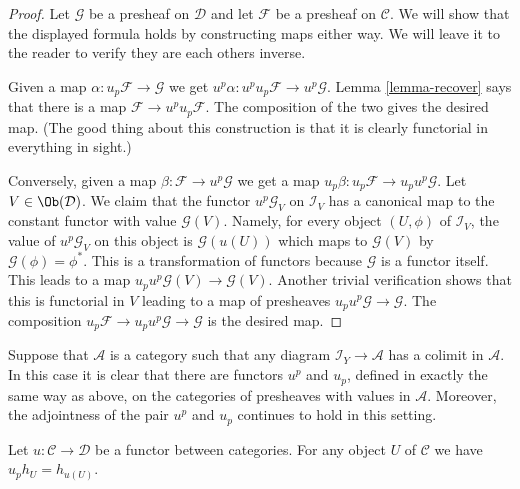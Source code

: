 \begin{proof}
Let $\mathcal{G}$ be a presheaf on $\mathcal{D}$ and let
$\mathcal{F}$ be a presheaf on $\mathcal{C}$.
We will show that the displayed formula holds
by constructing maps either way. We will leave
it to the reader to verify they are each others inverse.

\medskip\noindent
Given a map $\alpha : u_p \mathcal{F} \to \mathcal{G}$
we get $u^p\alpha : u^p u_p \mathcal{F} \to u^p \mathcal{G}$.
Lemma \ref{lemma-recover} says that there is a
map $\mathcal{F} \to u^p u_p \mathcal{F}$. The composition
of the two gives the desired map. (The good thing about this construction
is that it is clearly functorial in everything in sight.)

\medskip\noindent
Conversely, given a map $\beta : \mathcal{F} \to u^p\mathcal{G}$
we get a map $u_p\beta : u_p\mathcal{F} \to u_p u^p\mathcal{G}$.
Let $V \in \Ob(\mathcal{D})$.
We claim that the functor $u^p\mathcal{G}_V$ on $\mathcal{I}_V$
has a canonical map to the constant functor with value $\mathcal{G}(V)$.
Namely, for every object $(U, \phi)$ of $\mathcal{I}_V$,
the value of $u^p\mathcal{G}_V$ on this object is $\mathcal{G}(u(U))$
which maps to $\mathcal{G}(V)$ by $\mathcal{G}(\phi) = \phi^*$.
This is a transformation of functors because $\mathcal{G}$ is a functor
itself. This leads to a map $u_p u^p \mathcal{G}(V) \to \mathcal{G}(V)$.
Another trivial verification shows that this is functorial in $V$
leading to a map of presheaves $u_p u^p \mathcal{G} \to \mathcal{G}$.
The composition $u_p\mathcal{F} \to u_p u^p\mathcal{G} \to
\mathcal{G}$ is the desired map.
\end{proof}

\begin{remark}
\label{remark-functoriality-presheaves-values}
Suppose that $\mathcal{A}$ is a category such that
any diagram $\mathcal{I}_Y \to \mathcal{A}$ has a
colimit in $\mathcal{A}$. In this case it is clear
that there are functors $u^p$ and $u_p$, defined in
exactly the same way as above, on the categories
of presheaves with values in $\mathcal{A}$.
Moreover, the adjointness of the pair
$u^p$ and $u_p$ continues to hold in this setting.
\end{remark}

\begin{lemma}
\label{lemma-pullback-representable-presheaf}
Let $u : \mathcal{C} \to \mathcal{D}$ be a functor between categories.
For any object $U$ of $\mathcal{C}$ we have $u_ph_U = h_{u(U)}$.
\end{lemma}

